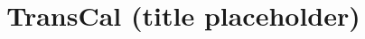 \documentclass[sigconf,review,anonymous,10pt]{acmart}
\begin{document}
\title{TransCal (title placeholder)}



\clearpage


\end{document}
